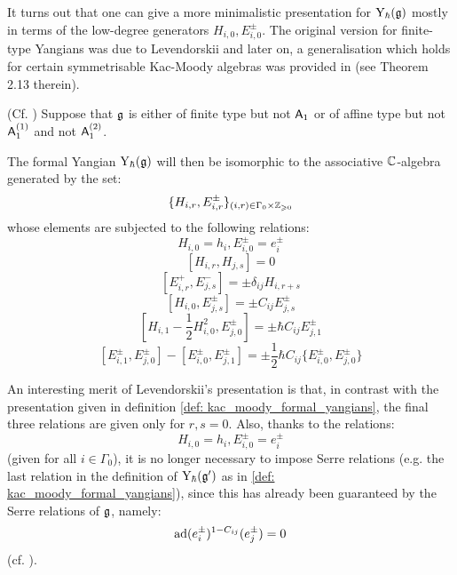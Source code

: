             It turns out that one can give a more minimalistic presentation for $\mathrm{Y}_{\hbar}(\mathfrak{g})$ mostly in terms of the low-degree generators $H_{i, 0}, E_{i, 0}^{\pm}$. The original version for finite-type Yangians was due to Levendorskii and later on, a generalisation which holds for certain symmetrisable Kac-Moody algebras was provided in \cite{guay_nakajima_wendlandt_affine_yangian_coproduct} (see Theorem 2.13 therein).
            \begin{theorem} \label{theorem: levendorskii_presentation}
                (Cf. \cite[Theorem 2.13]{guay_nakajima_wendlandt_affine_yangian_coproduct}) Suppose that $\mathfrak{g}$ is either of finite type but not $\mathsf{A}_1$ or of affine type but not $\mathsf{A}_1^{(1)}$ and not $\mathsf{A}_1^{(2)}$.
                
                The formal Yangian $\mathrm{Y}_{\hbar}(\mathfrak{g})$ will then be isomorphic to the associative $\mathbb{C}$-algebra generated by the set:
                    $$\{ H_{i, r}, E_{i, r}^{\pm} \}_{(i, r) \in \Gamma_0 \x \Z_{\geq 0}}$$
                whose elements are subjected to the following relations:
                    $$H_{i, 0} = h_i, E_{i, 0}^{\pm} = e_i^{\pm}$$
                    $$[ H_{i, r}, H_{j, s} ] = 0$$
                    $$[ E_{i, r}^+, E_{j, s}^- ] = \pm \delta_{ij} H_{i, r + s}$$
                    $$[ H_{i, 0}, E_{j, s}^{\pm} ] = \pm C_{ij} E_{j, s}^{\pm}$$
                    $$\left[ H_{i, 1} - \frac12 H_{i, 0}^2, E_{j, 0}^{\pm} \right] = \pm \hbar C_{ij} E_{j, 1}^{\pm}$$
                    $$[ E_{i, 1}^{\pm}, E_{j, 0}^{\pm} ] - [ E_{i, 0}^{\pm}, E_{j, 1}^{\pm} ] = \pm \frac12 \hbar C_{ij} \{E_{i, 0}^{\pm}, E_{j, 0}^{\pm}\}$$
            \end{theorem}
            \begin{remark}
                An interesting merit of Levendorskii's presentation is that, in contrast with the presentation given in definition \ref{def: kac_moody_formal_yangians}, the final three relations are given only for $r, s = 0$. Also, thanks to the relations:
                    $$H_{i, 0} = h_i, E_{i, 0}^{\pm} = e_i^{\pm}$$
                (given for all $i \in \Gamma_0$), it is no longer necessary to impose Serre relations (e.g. the last relation in the definition of $\mathrm{Y}_{\hbar}(\mathfrak{g}')$ as in \ref{def: kac_moody_formal_yangians}), since this has already been guaranteed by the Serre relations of $\mathfrak{g}$, namely:
                    $$\mathrm{ad}(e_i^{\pm})^{1 - C_{ij}}( e_j^{\pm} ) = 0$$
                (cf. \cite{humphreys_lie_algebras}).
            \end{remark}

